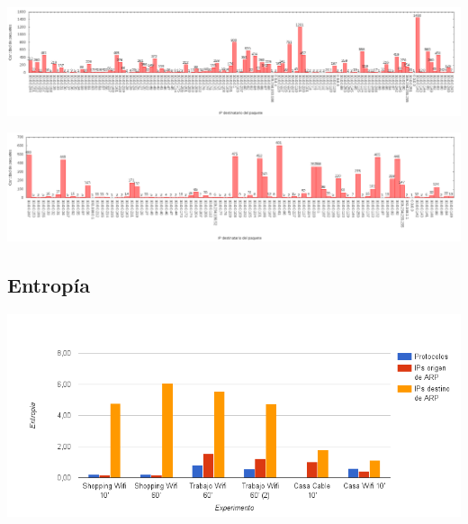 \begin{center}
\includegraphics[width=16cm]{../mediciones/job1/dst.png}
\end{center}

\begin{center}
\includegraphics[width=16cm]{../mediciones/job2/dst.png}
\end{center}

\subsection{Entropía}

\begin{center}
\includegraphics[width=14cm]{../mediciones/entropias.png}
\end{center}
